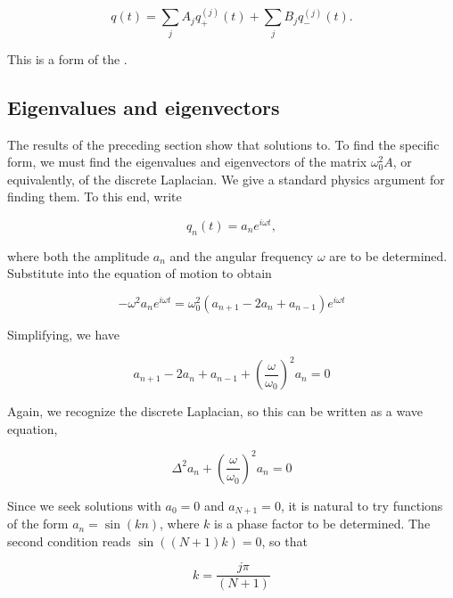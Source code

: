 \begin{equation}
q(t) = \sum_j A_j q^{(j)}_+(t)  +   \sum_j B_j q^{(j)}_-(t).
\end{equation}

This is a form of the .




\subsection{Eigenvalues and eigenvectors}

The results of the preceding section show that solutions to.  To find the specific form, we must find the eigenvalues and eigenvectors of the matrix $\omega_0^2A$, or equivalently, of the discrete Laplacian.  We give a standard physics argument for finding them.  To this end, write

\begin{equation}
q_n(t) = a_n e^{i\omega t},
\end{equation}

where both the amplitude $a_n$ and the angular frequency $\omega$ are to be determined.  Substitute into the equation of motion to obtain

\begin{equation}
-\omega^2 a_n e^{i\omega t}
= \omega_0^2( a_{n+1} - 2a_n + a_{n-1} ) e^{i\omega t}
\end{equation}

Simplifying, we have

\begin{equation}
\label{aneq}
a_{n+1} - 2a_n + a_{n-1} + \left(\frac{\omega}{\omega_0}\right)^2 a_n = 0
\end{equation}

Again, we recognize the discrete Laplacian, so this can be written as a wave equation,

\begin{equation}
\Delta^2 a_n + \left(\frac{\omega}{\omega_0}\right)^2 a_n = 0
\end{equation}

Since we seek solutions with $a_0 = 0$ and $a_{N+1} = 0$,
it is natural to try functions of the form $a_n = \sin(kn)$, where $k$ is a phase factor to be determined. The second condition reads $\sin((N+1)k) = 0$, so that

\begin{equation}
\label{crystalphasefactor}
k = \frac{j\pi}{(N+1)}
\end{equation}

